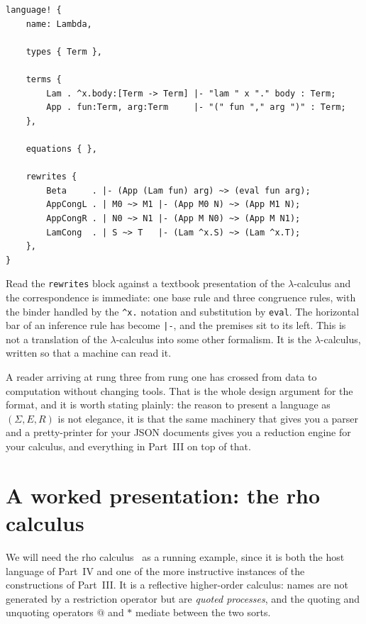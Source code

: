 \begin{lstlisting}
language! {
    name: Lambda,

    types { Term },

    terms {
        Lam . ^x.body:[Term -> Term] |- "lam " x "." body : Term;
        App . fun:Term, arg:Term     |- "(" fun "," arg ")" : Term;
    },

    equations { },

    rewrites {
        Beta     . |- (App (Lam fun) arg) ~> (eval fun arg);
        AppCongL . | M0 ~> M1 |- (App M0 N) ~> (App M1 N);
        AppCongR . | N0 ~> N1 |- (App M N0) ~> (App M N1);
        LamCong  . | S ~> T   |- (Lam ^x.S) ~> (Lam ^x.T);
    },
}
\end{lstlisting}

Read the \texttt{rewrites} block against a textbook presentation of the
$\lambda$-calculus and the correspondence is immediate: one base rule and three
congruence rules, with the binder handled by the \texttt{\^{}x.} notation and
substitution by \texttt{eval}. The horizontal bar of an inference rule has become
\texttt{|-}, and the premises sit to its left. This is not a translation of the
$\lambda$-calculus into some other formalism. It is the $\lambda$-calculus, written so
that a machine can read it.

\begin{remark}
A reader arriving at rung three from rung one has crossed from data to computation
without changing tools. That is the whole design argument for the format, and it is
worth stating plainly: the reason to present a language as $(\Sigma, E, R)$ is not
elegance, it is that the same machinery that gives you a parser and a pretty-printer
for your JSON documents gives you a reduction engine for your calculus, and everything
in Part~III on top of that.
\end{remark}

\section{A worked presentation: the rho calculus}
\label{ob:subsec:rho-presentation}

We will need the rho calculus~\cite{meredith2005rho} as a running example, since
it is both the host language of Part~IV and one of the more instructive instances of
the constructions of Part~III. It is a reflective higher-order calculus: names are not
generated by a restriction operator but are \emph{quoted processes}, and the quoting and
unquoting operators $@$ and $*$ mediate between the two sorts.


